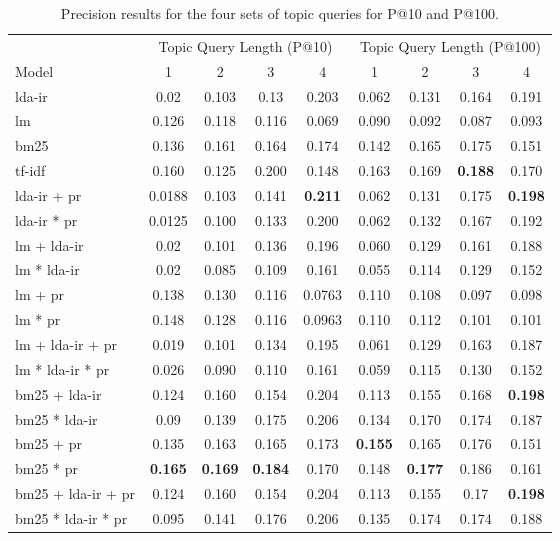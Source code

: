 \begin{table*}[h]
	\centering
	\caption{Precision results for the four sets of topic queries for P@10 and P@100.}
	\begin{tabular}{l|c|c|c|c||c|c|c|c}
		& \multicolumn{4}{c||}{Topic Query Length (P@10)} & \multicolumn{4}{c}{Topic Query Length (P@100)} \\
		Model & 1 & 2 & 3 & 4 & 1 & 2 & 3 & 4\\
		\midrule
		\gls{lda}-\gls{ir} & 0.02 & 0.103 & 0.13 & 0.203 & 0.062 & 0.131 & 0.164 & 0.191 \\
		\gls{lm} & 0.126 & 0.118 & 0.116 & 0.069 & 0.090 & 0.092 & 0.087 & 0.093\\
		\gls{bm25} & 0.136 & 0.161 & 0.164 & 0.174 & 0.142 & 0.165 & 0.175 & 0.151\\ 
		\gls{tf-idf} & 0.160 & 0.125 & 0.200 & 0.148 & 0.163 & 0.169 & \textbf{0.188} & 0.170 \\
		\gls{lda}-\gls{ir} + \gls{pr} & 0.0188 & 0.103 & 0.141 & \textbf{0.211} & 0.062 & 0.131 & 0.175 & \textbf{0.198} \\
		\gls{lda}-\gls{ir} * \gls{pr} & 0.0125 & 0.100 & 0.133 & 0.200 & 0.062 & 0.132 & 0.167 & 0.192 \\
		\gls{lm} + \gls{lda}-\gls{ir} & 0.02 & 0.101 & 0.136 & 0.196 & 0.060 & 0.129 & 0.161 & 0.188  \\
		\gls{lm} * \gls{lda}-\gls{ir} & 0.02 & 0.085 & 0.109 & 0.161 & 0.055 & 0.114 & 0.129 & 0.152 \\
		\gls{lm} + \gls{pr} & 0.138 & 0.130 & 0.116 & 0.0763 & 0.110 & 0.108 & 0.097 & 0.098 \\
		\gls{lm} * \gls{pr} & 0.148 & 0.128 & 0.116 & 0.0963 & 0.110 & 0.112 & 0.101 & 0.101 \\
		\gls{lm} + \gls{lda}-\gls{ir} + \gls{pr} & 0.019 & 0.101 & 0.134 & 0.195 & 0.061 & 0.129 & 0.163 & 0.187\\
		\gls{lm} * \gls{lda}-\gls{ir} * \gls{pr} & 0.026 & 0.090 & 0.110 & 0.161 & 0.059 & 0.115 & 0.130 & 0.152\\
		\gls{bm25} + \gls{lda}-\gls{ir} & 0.124 & 0.160 & 0.154 & 0.204 & 0.113 & 0.155 & 0.168 & \textbf{0.198} \\
		\gls{bm25} * \gls{lda}-\gls{ir} & 0.09 & 0.139 & 0.175& 0.206 & 0.134 & 0.170 & 0.174 & 0.187 \\
		\gls{bm25} + \gls{pr} & 0.135 & 0.163 & 0.165 & 0.173 & \textbf{0.155} & 0.165 & 0.176 & 0.151 \\
		\gls{bm25} * \gls{pr} & \textbf{0.165} & \textbf{0.169} & \textbf{0.184} & 0.170 & 0.148 & \textbf{0.177} & 0.186 & 0.161\\
		\gls{bm25} + \gls{lda}-\gls{ir} + \gls{pr} & 0.124 & 0.160 & 0.154 & 0.204 & 0.113 & 0.155 & 0.17 & \textbf{0.198}\\
		\gls{bm25} * \gls{lda}-\gls{ir} * \gls{pr} & 0.095 & 0.141 & 0.176 & 0.206 & 0.135 & 0.174 & 0.174 & 0.188\\
	\end{tabular}
	
	\label{tab:results_precision_at_10}
\end{table*}


